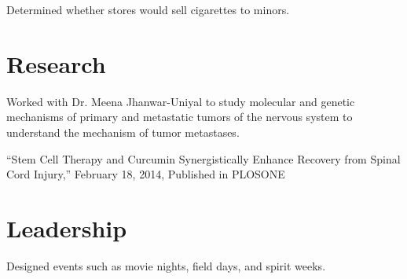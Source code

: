 \documentclass[letterpaper]{deedy-resume} %
\begin{document}
\begin{minipage}[t]{0.58\textwidth}

\begin{tightitemize}
\item Determined whether stores would sell cigarettes to minors.
\end{tightitemize}

\sectionspace %


\section{Research}


\begin{tightitemize}
\item Worked with Dr. Meena Jhanwar-Uniyal to study molecular and genetic mechanisms of primary and metastatic tumors of the nervous system to understand the mechanism of tumor metastases.
\item ``Stem Cell Therapy and Curcumin Synergistically Enhance Recovery from Spinal Cord Injury,'' February 18, 2014, Published in PLOSONE
\end{tightitemize}

\sectionspace %


\section{Leadership}


\begin{tightitemize}
\item Designed events such as movie nights, field days, and spirit weeks.
\end{tightitemize}


\end{minipage}
\end{document}
